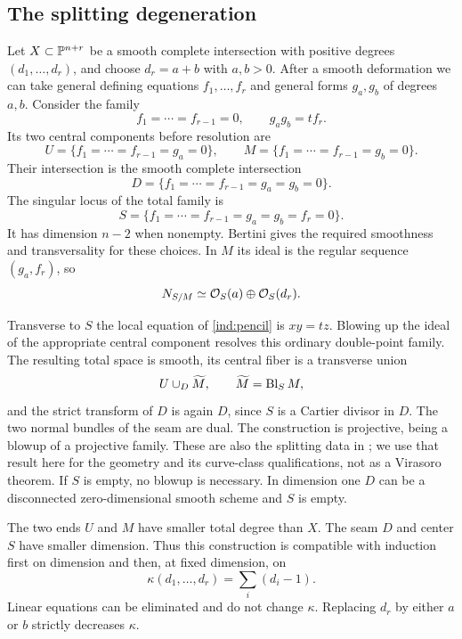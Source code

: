 \subsection{The splitting degeneration}

Let $X\subset\mathbb P^{n+r}$ be a smooth complete intersection with positive
degrees $(d_1,\ldots,d_r)$, and choose $d_r=a+b$ with $a,b>0$.
After a smooth deformation we can take general defining equations
$f_1,\ldots,f_r$ and general forms $g_a,g_b$ of degrees $a,b$.
Consider the family
\begin{equation}
\label{ind:pencil}
 f_1=\cdots=f_{r-1}=0,\qquad g_a g_b=t f_r.
\end{equation}
Its two central components before resolution are
\[
 U=\{f_1=\cdots=f_{r-1}=g_a=0\},\qquad
 M=\{f_1=\cdots=f_{r-1}=g_b=0\}.
\]
Their intersection is the smooth complete intersection
\[
 D=\{f_1=\cdots=f_{r-1}=g_a=g_b=0\}.
\]
The singular locus of the total family is
\[
 S=\{f_1=\cdots=f_{r-1}=g_a=g_b=f_r=0\}.
\]
It has dimension $n-2$ when nonempty. Bertini gives the required
smoothness and transversality for these choices. In $M$ its ideal is
the regular sequence $(g_a,f_r)$, so
\begin{equation}
\label{ind:split-normal}
 N_{S/M}\simeq\mathcal O_S(a)\oplus\mathcal O_S(d_r).
\end{equation}

Transverse to $S$ the local equation of \eqref{ind:pencil} is
$xy=tz$. Blowing up the ideal of the appropriate central component
resolves this ordinary double-point family. The resulting total space
is smooth, its central fiber is a transverse union
\begin{equation}
\label{ind:resolved-splitting}
 U\cup_D\widetilde M,\qquad \widetilde M=\operatorname{Bl}_S M,
\end{equation}
and the strict transform of $D$ is again $D$, since $S$ is a Cartier
divisor in $D$. The two normal bundles of the seam are dual. The
construction is projective, being a blowup of a projective family.
These are also the splitting data in
\cite[Theorem~5.3 and its proof]{ABPZ}; we use that result here for the
geometry and its curve-class qualifications, not as a Virasoro theorem.
If $S$ is empty, no blowup is necessary. In dimension one $D$ can be a
disconnected zero-dimensional smooth scheme and $S$ is empty.

The two ends $U$ and $M$ have smaller total degree than $X$. The seam
$D$ and center $S$ have smaller dimension. Thus this construction is
compatible with induction first on dimension and then, at fixed
dimension, on
\begin{equation}
\label{ind:complexity}
 \kappa(d_1,\ldots,d_r)=\sum_i(d_i-1).
\end{equation}
Linear equations can be eliminated and do not change $\kappa$.
Replacing $d_r$ by either $a$ or $b$ strictly decreases $\kappa$.

